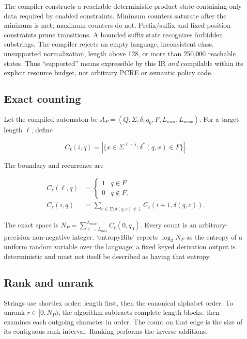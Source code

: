 \documentclass[preprint,12pt]{elsarticle}
\begin{document}
The compiler constructs a reachable deterministic product state containing
only data required by enabled constraints. Minimum counters saturate after the
minimum is met; maximum counters do not. Prefix/suffix and fixed-position
constraints prune transitions. A bounded suffix state recognizes forbidden
substrings. The compiler rejects an empty language, inconsistent class,
unsupported normalization, length above 128, or more than 250,000 reachable
states. Thus ``supported'' means expressible by this IR \emph{and} compilable
within its explicit resource budget, not arbitrary PCRE or semantic policy
code.

\subsection{Exact counting}

Let the compiled automaton be
$A_P=(Q,\Sigma,\delta,q_0,F,L_{min},L_{max})$. For a target length $\ell$, define

\begin{equation}
C_\ell(i,q)=\left|\{x\in\Sigma^{\ell-i}:\delta^*(q,x)\in F\}\right|.
\end{equation}

The boundary and recurrence are

\begin{align}
C_\ell(\ell,q)&=\begin{cases}1&q\in F\\0&q\notin F,\end{cases}\\
C_\ell(i,q)&=\sum_{c\in\Sigma:\delta(q,c)\ne\bot}
 C_\ell(i+1,\delta(q,c)).
\end{align}

The exact space is
$N_P=\sum_{\ell=L_{min}}^{L_{max}}C_\ell(0,q_0)$. Every count is an arbitrary-
precision non-negative integer. `entropyBits' reports $\log_2 N_P$ as the
entropy of a uniform random variable over the language; a fixed keyed
derivation output is deterministic and must not itself be described as having
that entropy.

\subsection{Rank and unrank}

Strings use shortlex order: length first, then the canonical alphabet order.
To unrank $r\in[0,N_P)$, the algorithm subtracts complete length blocks, then
examines each outgoing character in order. The count on that edge is the size
of its contiguous rank interval. Ranking performs the inverse additions.
\end{document}
